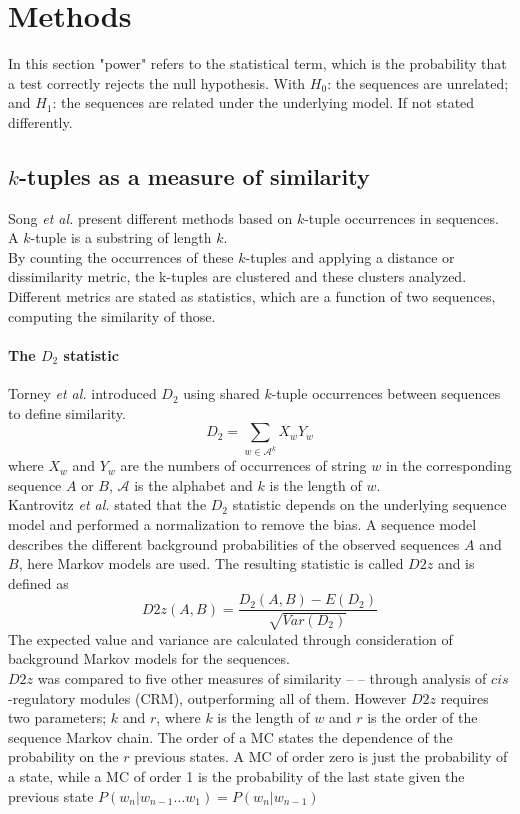\documentclass[twocolumn]{bmcart}%
\begin{document}
\section*{Methods}
In this section "power" refers to the statistical term, which is the probability that a test correctly rejects the null hypothesis. With $H_0$: the sequences are unrelated; and $H_1$: the sequences are related under the underlying model. If not stated differently.
\subsection*{$k$-tuples as a measure of similarity}
Song \textit{et al.}\cite{doi:10.1093/bib/bbt067} present different methods based on $k$-tuple occurrences in sequences. A $k$-tuple is a substring of length $k$.\\
By counting the occurrences of these $k$-tuples and applying a distance or dissimilarity metric, the k-tuples are clustered and these clusters analyzed. Different metrics are stated as statistics, which are a function of two sequences, computing the similarity of those.\\
\paragraph*{The $D_2$ statistic}
Torney \textit{et al.}\cite{torney1990computation} introduced $D_2$  using shared $k$-tuple  occurrences between sequences to define similarity.
$$D_2=\sum_{w\in \mathcal{A}^k}X_wY_w$$
where $X_w$ and $Y_w$ are the numbers of occurrences of string $w$ in the corresponding sequence $A$ or $B$, $ \mathcal{A}$ is the alphabet and $k$ is the length of $w$.\\
Kantrovitz \textit{et al.}\cite{kantorovitz2007statistical} stated that the $D_2$ statistic depends on the  underlying sequence model and performed a normalization to remove the bias. A sequence model describes the different background probabilities of the observed sequences $A$ and $B$, here Markov models are used.
The resulting statistic is called $D2z$ and is defined as
$$D2z(A,B)=\frac{D_2(A,B)-E(D_2)}{\sqrt{Var(D_2)}}$$
The expected value and variance are calculated through consideration of background Markov models for the sequences.\\
$D2z$ was compared to five other measures of similarity -- \cite{doi:10.1093/bib/bbt067,kantorovitz2007statistical} -- through analysis of $cis$-regulatory modules (CRM), outperforming all of them. However $D2z$ requires two parameters; $k$ and $r$, where $k$ is the length of $w$ and $r$ is the order of the sequence Markov chain. The order of a MC states the dependence of the probability on the $r$ previous states. A MC of order zero is just the probability of a state, while a MC of order 1 is the probability of the last state given the previous state $P(w_n|w_{n-1}\dots w_1)=P(w_n|w_{n-1})$
\end{document}
